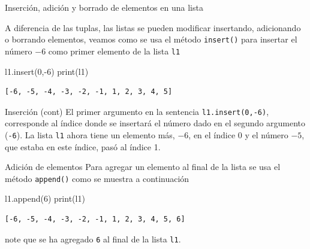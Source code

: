 \documentclass[
  ignorenonframetext,
  aspectratio=169,
  spanish,
]{beamer}
\newenvironment{Shaded}{\begin{snugshade}}{\end{snugshade}}
\newcommand{\BuiltInTok}[1]{\textcolor[rgb]{0.00,0.23,0.31}{#1}}
\newcommand{\DecValTok}[1]{\textcolor[rgb]{0.68,0.00,0.00}{#1}}
\newcommand{\NormalTok}[1]{\textcolor[rgb]{0.00,0.23,0.31}{#1}}
\newcommand{\OperatorTok}[1]{\textcolor[rgb]{0.37,0.37,0.37}{#1}}
\begin{document}
\begin{frame}[fragile]{Inserción, adición y borrado de elementos en una
lista}
\label{inserciuxf3n-adiciuxf3n-y-borrado-de-elementos-en-una-lista}

A diferencia de las tuplas, las listas se pueden modificar insertando,
adicionando o borrando elementos, veamos como se usa el método
\texttt{insert()} para insertar el número \(-6\) como primer elemento de
la lista \texttt{l1}

\begin{Shaded}
\begin{Highlighting}[]
\NormalTok{l1.insert(}\DecValTok{0}\NormalTok{,}\OperatorTok{{-}}\DecValTok{6}\NormalTok{)}
\BuiltInTok{print}\NormalTok{(l1)}
\end{Highlighting}
\end{Shaded}

\begin{verbatim}
[-6, -5, -4, -3, -2, -1, 1, 2, 3, 4, 5]
\end{verbatim}
\end{frame}

\begin{frame}[fragile]{Inserción (cont)}
\label{inserciuxf3n-cont}
El primer argumento en la sentencia \texttt{l1.insert(0,-6)},
corresponde al índice donde se insertará el número dado en el segundo
argumento (\texttt{-6}). La lista \texttt{l1} ahora tiene un elemento
más, \(-6\), en el índice 0 y el número \(-5\), que estaba en este
índice, pasó al índice 1.
\end{frame}

\begin{frame}[fragile]{Adición de elementos}
\label{adiciuxf3n-de-elementos}
Para agregar un elemento al final de la lista se usa el método
\texttt{append()} como se muestra a
continuación

\begin{Shaded}
\begin{Highlighting}[]
\NormalTok{l1.append(}\DecValTok{6}\NormalTok{) }
\BuiltInTok{print}\NormalTok{(l1)}
\end{Highlighting}
\end{Shaded}

\begin{verbatim}
[-6, -5, -4, -3, -2, -1, 1, 2, 3, 4, 5, 6]
\end{verbatim}

note que se ha agregado \texttt{6} al final de la lista \texttt{l1}.
\end{frame}
\end{document}
